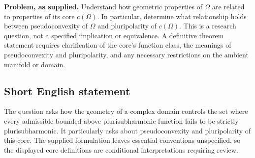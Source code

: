 \documentclass[11pt]{article}
\begin{document}
\textbf{Problem, as supplied.} Understand how geometric properties of \(\Omega\) are related to properties of its core \(c(\Omega)\). In particular, determine what relationship holds between pseudoconvexity of \(\Omega\) and pluripolarity of \(c(\Omega)\). This is a research question, not a specified implication or equivalence. A definitive theorem statement requires clarification of the core's function class, the meanings of pseudoconvexity and pluripolarity, and any necessary restrictions on the ambient manifold or domain.
\subsection{Short English statement}
The question asks how the geometry of a complex domain controls the set where every admissible bounded-above plurisubharmonic function fails to be strictly plurisubharmonic. It particularly asks about pseudoconvexity and pluripolarity of this core. The supplied formulation leaves essential conventions unspecified, so the displayed core definitions are conditional interpretations requiring review.
\end{document}
